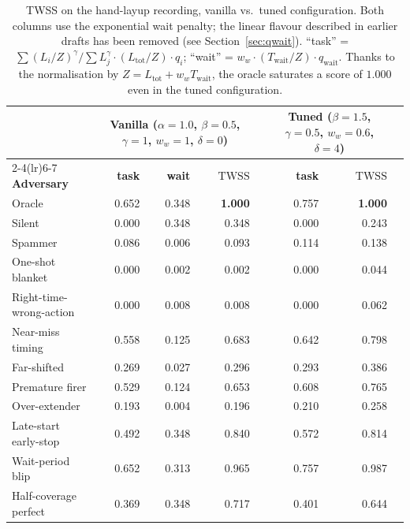 \documentclass[11pt]{article}
\newcommand{\TWSS}{\mathrm{TWSS}}
\newcommand{\Twait}{T_{\text{wait}}}
\newcommand{\qi}{q_i}
\newcommand{\qwait}{q_{\text{wait}}}
\begin{document}
\begin{table}[ht]
\centering
\small
\begin{tabular}{lrrrrrrr}
\toprule
& \multicolumn{3}{c}{\textbf{Vanilla} ($\alpha{=}1.0$, $\beta{=}0.5$,
                                       $\gamma{=}1$, $w_w{=}1$, $\delta{=}0$)} &
& \multicolumn{2}{c}{\textbf{Tuned} ($\beta{=}1.5$, $\gamma{=}0.5$,
                                     $w_w{=}0.6$, $\delta{=}4$)} \\
\cmidrule(lr){2-4}\cmidrule(lr){6-7}
\textbf{Adversary} & \textbf{task} & \textbf{wait} & $\bm{\TWSS}$ & &
                     \textbf{task} & $\bm{\TWSS}$ \\
\midrule
Oracle                   & 0.652 & 0.348 & \textbf{1.000} & & 0.757 & \textbf{1.000} \\
Silent                   & 0.000 & 0.348 & 0.348 & & 0.000 & 0.243 \\
Spammer                  & 0.086 & 0.006 & 0.093 & & 0.114 & 0.138 \\
One-shot blanket         & 0.000 & 0.002 & 0.002 & & 0.000 & 0.044 \\
Right-time-wrong-action  & 0.000 & 0.008 & 0.008 & & 0.000 & 0.062 \\
Near-miss timing         & 0.558 & 0.125 & 0.683 & & 0.642 & 0.798 \\
Far-shifted              & 0.269 & 0.027 & 0.296 & & 0.293 & 0.386 \\
Premature firer          & 0.529 & 0.124 & 0.653 & & 0.608 & 0.765 \\
Over-extender            & 0.193 & 0.004 & 0.196 & & 0.210 & 0.258 \\
Late-start early-stop    & 0.492 & 0.348 & 0.840 & & 0.572 & 0.814 \\
Wait-period blip         & 0.652 & 0.313 & 0.965 & & 0.757 & 0.987 \\
Half-coverage perfect    & 0.369 & 0.348 & 0.717 & & 0.401 & 0.644 \\
\bottomrule
\end{tabular}
\caption{TWSS on the hand-layup recording, vanilla vs.\ tuned
configuration. Both columns use the exponential wait penalty;
the linear flavour described in earlier drafts has been removed
(see Section~\ref{sec:qwait}). ``task'' = $\sum (L_i/Z)^\gamma /
\sum L_j^\gamma \cdot (L_{\text{tot}}/Z) \cdot \qi$;
``wait'' = $w_w \cdot (\Twait/Z) \cdot \qwait$. Thanks to the normalisation
by $Z = L_{\text{tot}} + w_w\Twait$, the oracle saturates a score of $1.000$
even in the tuned configuration.}
\label{tab:twss-layup}
\end{table}
\end{document}

